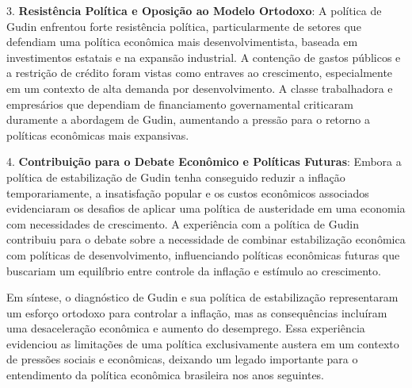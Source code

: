 \documentclass[a4paper,12pt]{article}[abntex2]
\begin{document}
3. \textbf{Resistência Política e Oposição ao Modelo Ortodoxo}: A política de Gudin enfrentou forte resistência política, particularmente de setores que defendiam uma política econômica mais desenvolvimentista, baseada em investimentos estatais e na expansão industrial. A contenção de gastos públicos e a restrição de crédito foram vistas como entraves ao crescimento, especialmente em um contexto de alta demanda por desenvolvimento. A classe trabalhadora e empresários que dependiam de financiamento governamental criticaram duramente a abordagem de Gudin, aumentando a pressão para o retorno a políticas econômicas mais expansivas.

4. \textbf{Contribuição para o Debate Econômico e Políticas Futuras}: Embora a política de estabilização de Gudin tenha conseguido reduzir a inflação temporariamente, a insatisfação popular e os custos econômicos associados evidenciaram os desafios de aplicar uma política de austeridade em uma economia com necessidades de crescimento. A experiência com a política de Gudin contribuiu para o debate sobre a necessidade de combinar estabilização econômica com políticas de desenvolvimento, influenciando políticas econômicas futuras que buscariam um equilíbrio entre controle da inflação e estímulo ao crescimento.

Em síntese, o diagnóstico de Gudin e sua política de estabilização representaram um esforço ortodoxo para controlar a inflação, mas as consequências incluíram uma desaceleração econômica e aumento do desemprego. Essa experiência evidenciou as limitações de uma política exclusivamente austera em um contexto de pressões sociais e econômicas, deixando um legado importante para o entendimento da política econômica brasileira nos anos seguintes.
\end{document}
